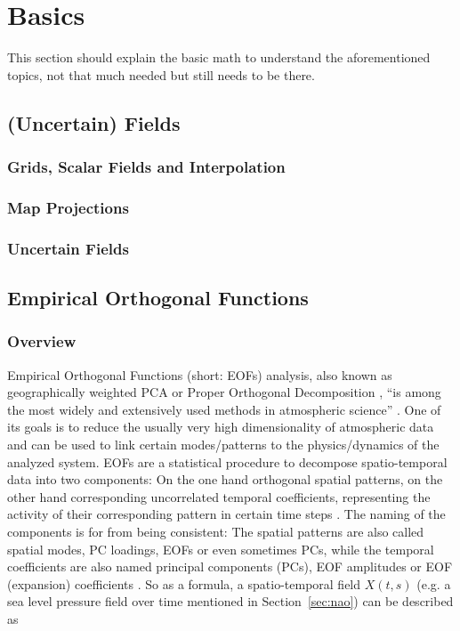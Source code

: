 
\chapter{Basics}
\label{ch:basics}

This section should explain the basic math to understand the aforementioned topics, not that much needed but still needs to be there.

\section{(Uncertain) Fields}
\label{sec:uncertainfields}

\subsection{Grids, Scalar Fields and Interpolation}


\subsection{Map Projections}

\subsection{Uncertain Fields}

\section{Empirical Orthogonal Functions}
\label{sec:eof}


\subsection{Overview}

Empirical Orthogonal Functions (short: EOFs) analysis, also known as geographically weighted PCA or Proper Orthogonal Decomposition \cite{vietinghoffdiss}, \enquote{is among the most widely and extensively used methods in atmospheric science} \cite{hannachi_empirical_2007}. 
One of its goals is to reduce the usually very high dimensionality of atmospheric data and can be used to link certain modes/patterns to the physics/dynamics of the analyzed system.  
EOFs are a statistical procedure to decompose spatio-temporal data into two components: On the one hand orthogonal spatial patterns, on the other hand corresponding uncorrelated temporal coefficients, representing the activity of their corresponding pattern in certain time steps \cite{hannachi_empirical_2007, vietinghoffdiss}. 
The naming of the components is for from being consistent: The spatial patterns are also called spatial modes, PC loadings, EOFs or even sometimes PCs, while the temporal coefficients are also named principal components (PCs), EOF amplitudes or EOF (expansion) coefficients \cite{hannachi_empirical_2007}. 
So as a formula, a spatio-temporal field $X(t, s)$ (e.g. a sea level pressure field over time mentioned in Section~\ref{sec:nao}) can be described as

